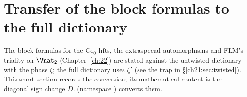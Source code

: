 \section{Transfer of the block formulas to the full dictionary}\label{ch21:sec:transfer}

The block formulas for the $\mathrm{Co}_0$-lifts, the extraspecial automorphisms and FLM's triality on
$\Vnat_2$ (Chapter~\ref{ch:22}) are stated against the untwisted dictionary with the phase $\zeta$; the full
dictionary uses $\zeta'$ (see the trap in \S\ref{ch21:sec:twisted}).  This short section records the
conversion; its mathematical content is the diagonal sign change $D$.   (namespace
) converts them.

